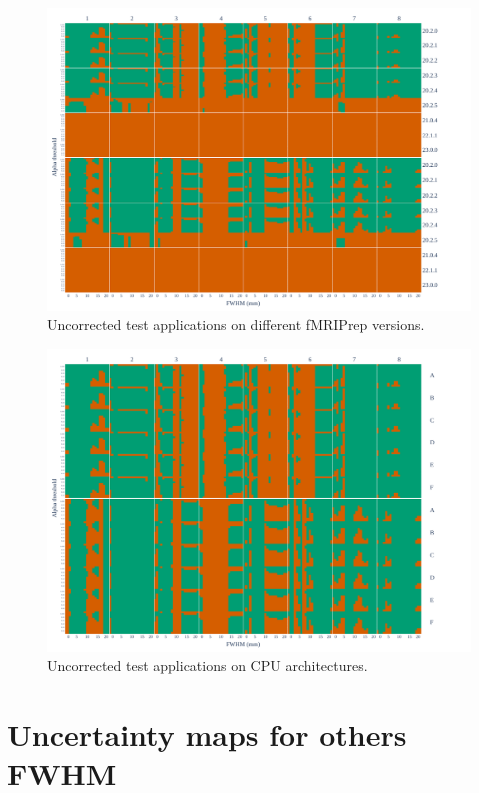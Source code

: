 \documentclass[lettersize,journal]{IEEEtran}
\newcommand{\fmriprep}{fMRIPrep\xspace}
\begin{document}
    \begin{figure}
        \centering
        \includegraphics[width=\linewidth]{figures/fmriprep-versions/pce.pdf}
        \caption{Uncorrected test applications on different \fmriprep versions.}
        \label{fig:versions_pce}
    \end{figure}

    \begin{figure}
        \centering
        \includegraphics[width=\linewidth]{figures/arch/arch_pce_.pdf}
        \caption{Uncorrected test applications on CPU architectures.}
        \label{fig:arch_pce}
    \end{figure}


    \section{Uncertainty maps for others FWHM}
\end{document}
